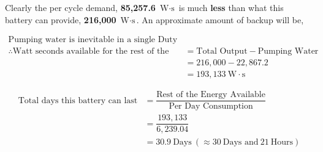 \documentclass[../main.tex]{subfiles}
\begin{document}
Clearly the per cycle demand, \textbf{85,257.6} $\mbox{W} \cdot \mbox{s}$ is
much \textbf{less} than what this battery can provide, \textbf{216,000}
$\mbox{W} \cdot \mbox{s}$. An approximate amount of backup will be,

\begin{align*}
    \mbox{Pumping water is inevitable in a single Duty Cycle.} \\
    \therefore \mbox{Watt seconds available for the rest of the Cycle} &= \mbox{Total Output} - \mbox{Pumping Water} \\
    &= 216,000 - 22,867.2 \\
    &= 193,133 \: \mbox{W} \cdot \mbox{s}
\end{align*}

\begin{align*}
    \mbox{Total days this battery can last} &= \dfrac{\mbox{Rest of the Energy Available}}{\mbox{Per Day Consumption}} \\
    &= \dfrac{193,133}{6,239.04} \\
    &= 30.9 \: \mbox{Days} \: (\approx 30 \: \mbox{Days and} \: 21 \: \mbox{Hours})
\end{align*}
\end{document}
